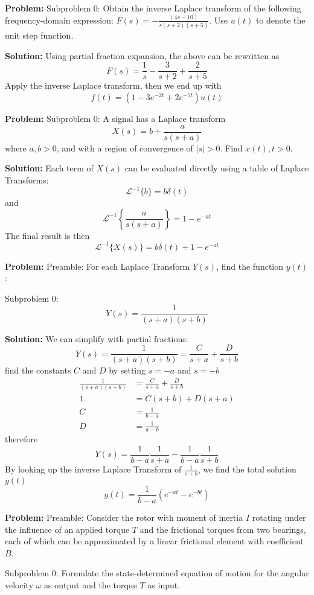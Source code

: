 \documentclass[10pt]{article}
\begin{document}
\textbf{Problem:}
Subproblem 0: Obtain the inverse Laplace transform of the following frequency-domain expression: $F(s) = -\frac{(4 s-10)}{s(s+2)(s+5)}$.
Use $u(t)$ to denote the unit step function.


\textbf{Solution:}
Using partial fraction expansion, the above can be rewritten as 
\[
F(s) = \frac{1}{s} - \frac{3}{s+2} + \frac{2}{s+5}
\]
Apply the inverse Laplace transform, then we end up with
\[
f(t) = \boxed{(1 - 3e^{-2t} + 2e^{-5t}) u(t)}
\]


\textbf{Problem:}
Subproblem 0: A signal has a Laplace transform
\[
X(s)=b+\frac{a}{s(s+a)}
\]
where \(a, b>0\), and with a region of convergence of \(|s|>0\). Find \(x(t), t>0\).


\textbf{Solution:}
Each term of \(X(s)\) can be evaluated directly using a table of Laplace Transforms:
\[
\mathcal{L}^{-1}\{b\}=b \delta(t)
\]
and
\[
\mathcal{L}^{-1}\left\{\frac{a}{s(s+a)}\right\}=1-e^{-a t}
\]
The final result is then
\[
\mathcal{L}^{-1}\{X(s)\}=\boxed{b \delta(t)+1-e^{-a t}}
\]


\textbf{Problem:}
Preamble: For each Laplace Transform \(Y(s)\), find the function \(y(t)\) :

Subproblem 0: \[
Y(s)=\boxed{\frac{1}{(s+a)(s+b)}}
\]


\textbf{Solution:}
We can simplify with partial fractions:
\[
Y(s)=\frac{1}{(s+a)(s+b)}=\frac{C}{s+a}+\frac{D}{s+b}
\]
find the constants \(C\) and \(D\) by setting \(s=-a\) and \(s=-b\)
\[
\begin{aligned}
\frac{1}{(s+a)(s+b)} &=\frac{C}{s+a}+\frac{D}{s+b} \\
1 &=C(s+b)+D(s+a) \\
C &=\frac{1}{b-a} \\
D &=\frac{1}{a-b}
\end{aligned}
\]
therefore
\[
Y(s)=\frac{1}{b-a} \frac{1}{s+a}-\frac{1}{b-a} \frac{1}{s+b}
\]
By looking up the inverse Laplace Transform of \(\frac{1}{s+b}\), we find the total solution \(y(t)\)
\[
y(t)=\boxed{\frac{1}{b-a}\left(e^{-a t}-e^{-b t}\right)}
\]


\textbf{Problem:}
Preamble: Consider the rotor with moment of inertia \(I\) rotating under the influence of an applied torque \(T\) and the frictional torques from two bearings, each of which can be approximated by a linear frictional element with coefficient \(B\).

Subproblem 0: Formulate the state-determined equation of motion for the angular velocity $\omega$ as output and the torque $T$ as input.
\end{document}
